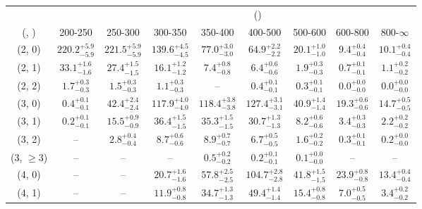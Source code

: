 \begin{table}[h!]
\tiny
\centering
{}
\begin{tabular}
{ccccccccc}
	\hline\hline
&	& \multicolumn{8}{c}{\scalht (\gev)} \\ 
	 (\njet,  \nb) & 200-250 & 250-300 & 300-350 & 350-400 & 400-500 & 500-600 & 600-800 & 800-$\infty$ \\ [0.8ex] 
\hline
	(2, 0) & $220.2^{+ 5.9 }_{- 5.9 }$ & $221.5^{+ 5.9 }_{- 5.9 }$ & $139.6^{+ 4.5 }_{- 4.5 }$ & $77.0^{+ 3.0 }_{- 3.0 }$ & $64.9^{+ 2.2 }_{- 2.2 }$ & $20.1^{+ 1.0 }_{- 1.0 }$ & $9.4^{+ 0.4 }_{- 0.4 }$ & $10.1^{+ 0.4 }_{- 0.4 }$ \\[0.5ex] 
	(2, 1) & $33.1^{+ 1.6 }_{- 1.6 }$ & $27.4^{+ 1.5 }_{- 1.5 }$ & $16.1^{+ 1.2 }_{- 1.2 }$ & $7.4^{+ 0.8 }_{- 0.8 }$ & $6.4^{+ 0.6 }_{- 0.6 }$ & $1.9^{+ 0.3 }_{- 0.3 }$ & $0.7^{+ 0.1 }_{- 0.1 }$ & $1.1^{+ 0.2 }_{- 0.2 }$ \\[0.5ex] 
	(2, 2) & $1.7^{+ 0.3 }_{- 0.3 }$ & $1.5^{+ 0.3 }_{- 0.3 }$ & $1.1^{+ 0.3 }_{- 0.3 }$ & -- & $0.4^{+ 0.1 }_{- 0.1 }$ & $0.3^{+ 0.1 }_{- 0.1 }$ & $0.0^{+ 0.0 }_{- 0.0 }$ & $0.0^{+ 0.0 }_{- 0.0 }$ \\[0.5ex] 
	(3, 0) & $0.4^{+ 0.1 }_{- 0.1 }$ & $42.4^{+ 2.4 }_{- 2.4 }$ & $117.9^{+ 4.0 }_{- 4.0 }$ & $118.4^{+ 3.8 }_{- 3.8 }$ & $127.4^{+ 3.1 }_{- 3.1 }$ & $40.9^{+ 1.4 }_{- 1.4 }$ & $19.3^{+ 0.6 }_{- 0.6 }$ & $14.7^{+ 0.5 }_{- 0.5 }$ \\[0.5ex] 
	(3, 1) & $0.2^{+ 0.1 }_{- 0.1 }$ & $15.5^{+ 0.9 }_{- 0.9 }$ & $36.4^{+ 1.5 }_{- 1.5 }$ & $35.3^{+ 1.5 }_{- 1.5 }$ & $30.7^{+ 1.3 }_{- 1.3 }$ & $8.2^{+ 0.6 }_{- 0.6 }$ & $3.4^{+ 0.3 }_{- 0.3 }$ & $2.2^{+ 0.2 }_{- 0.2 }$ \\[0.5ex] 
	(3, 2) & -- & $2.8^{+ 0.4 }_{- 0.4 }$ & $8.7^{+ 0.6 }_{- 0.6 }$ & $8.9^{+ 0.7 }_{- 0.7 }$ & $6.7^{+ 0.5 }_{- 0.5 }$ & $1.6^{+ 0.2 }_{- 0.2 }$ & $0.3^{+ 0.1 }_{- 0.1 }$ & $0.2^{+ 0.0 }_{- 0.0 }$ \\[0.5ex] 
	(3, $\ge3$) & -- & -- & -- & $0.5^{+ 0.2 }_{- 0.2 }$ & $0.2^{+ 0.1 }_{- 0.1 }$ & $0.1^{+ 0.0 }_{- 0.0 }$ & -- & -- \\[0.5ex] 
	(4, 0) & -- & -- & $20.7^{+ 1.6 }_{- 1.6 }$ & $57.8^{+ 2.5 }_{- 2.5 }$ & $104.7^{+ 2.8 }_{- 2.8 }$ & $41.8^{+ 1.5 }_{- 1.5 }$ & $23.9^{+ 0.8 }_{- 0.8 }$ & $13.4^{+ 0.4 }_{- 0.4 }$ \\[0.5ex] 
	(4, 1) & -- & -- & $11.9^{+ 0.8 }_{- 0.8 }$ & $34.7^{+ 1.3 }_{- 1.3 }$ & $49.4^{+ 1.4 }_{- 1.4 }$ & $15.4^{+ 0.8 }_{- 0.8 }$ & $7.0^{+ 0.5 }_{- 0.5 }$ & $3.4^{+ 0.2 }_{- 0.2 }$ \\[0.5ex] 

\end{tabular}
\end{table}
